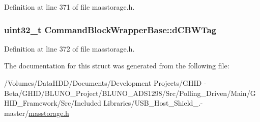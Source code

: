 \-Definition at line 371 of file masstorage.\-h.

\hypertarget{struct_command_block_wrapper_base_a0898a332eec2d598b80a896ff66d5549}{
\subsubsection[{d\-C\-B\-W\-Tag}]{\setlength{\rightskip}{0pt plus 5cm}uint32\-\_\-t {\bf \-Command\-Block\-Wrapper\-Base\-::d\-C\-B\-W\-Tag}}}\label{struct_command_block_wrapper_base_a0898a332eec2d598b80a896ff66d5549}


\-Definition at line 372 of file masstorage.\-h.



\-The documentation for this struct was generated from the following file\-:\begin{DoxyCompactItemize}
\item 
/\-Volumes/\-Data\-H\-D\-D/\-Documents/\-Development Projects/\-G\-H\-I\-D -\/ Beta/\-G\-H\-I\-D/\-B\-L\-U\-N\-O\-\_\-\-Project/\-B\-L\-U\-N\-O\-\_\-\-A\-D\-S1298/\-Src/\-Polling\-\_\-\-Driven/\-Main/\-G\-H\-I\-D\-\_\-\-Framework/\-Src/\-Included Libraries/\-U\-S\-B\-\_\-\-Host\-\_\-\-Shield\-\_.-\/master/\hyperlink{masstorage_8h}{masstorage.\-h}\end{DoxyCompactItemize}
